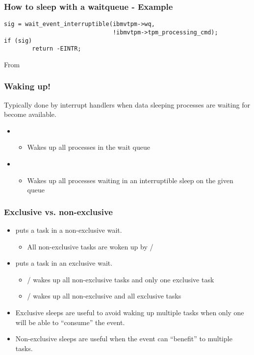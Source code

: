 \begin{frame}[fragile]
\frametitle{How to sleep with a waitqueue - Example}
\begin{verbatim}
sig = wait_event_interruptible(ibmvtpm->wq,
                               !ibmvtpm->tpm_processing_cmd);
if (sig)
        return -EINTR;
\end{verbatim}
From 
\end{frame}

\begin{frame}
  \frametitle{Waking up!}
  Typically done by interrupt handlers when data sleeping
  processes are waiting for become available.
  \begin{itemize}
  \item {}
    \begin{itemize}
    \item Wakes up all processes in the wait queue
    \end{itemize}
  \item {}
    \begin{itemize}
    \item Wakes up all processes waiting in an interruptible sleep
      on the given queue
    \end{itemize}
  \end{itemize}
\end{frame}

\begin{frame}
  \frametitle{Exclusive vs. non-exclusive}
  \begin{itemize}
  \item {} puts a task in a
    non-exclusive wait.
    \begin{itemize}
    \item All non-exclusive tasks are woken up by  /
    \end{itemize}
  \item {} puts a task in an
    exclusive wait.
    \begin{itemize}
    \item {} /  wakes up
      all non-exclusive tasks and only one exclusive task
    \item {} / 
      wakes up all non-exclusive and all exclusive tasks
    \end{itemize}
  \item Exclusive sleeps are useful to avoid waking up multiple tasks
    when only one will be able to ``consume'' the event.
  \item Non-exclusive sleeps are useful when the event can ``benefit''
    to multiple tasks.
  \end{itemize}
\end{frame}

